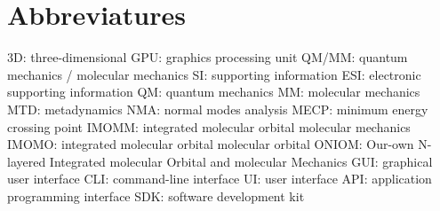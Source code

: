 \section{Abbreviatures}

3D: three-dimensional
GPU: graphics processing unit
QM/MM: quantum mechanics / molecular mechanics
SI: supporting information
ESI: electronic supporting information
QM: quantum mechanics
MM: molecular mechanics
MTD: metadynamics
NMA: normal modes analysis
MECP: minimum energy crossing point
IMOMM: integrated molecular orbital molecular mechanics
IMOMO: integrated molecular orbital molecular orbital
ONIOM: Our-own N-layered Integrated molecular Orbital and molecular Mechanics
GUI: graphical user interface
CLI: command-line interface
UI: user interface
API: application programming interface
SDK: software development kit
